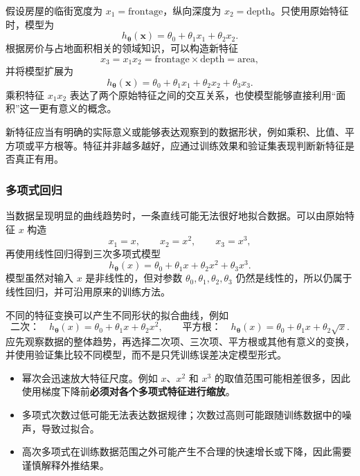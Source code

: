 \documentclass[12pt,a4paper]{ctexart}
\newcommand{\important}[1]{\textbf{\textcolor{MainColor}{#1}}}
\begin{document}
\begin{examplebox}[房价预测中的组合特征]
假设房屋的临街宽度为 $x_1=\mathrm{frontage}$，纵向深度为 $x_2=\mathrm{depth}$。只使用原始特征时，模型为
\[
  h_{\boldsymbol{\theta}}(\mathbf{x})
  =\theta_0+\theta_1x_1+\theta_2x_2.
\]
根据房价与占地面积相关的领域知识，可以构造新特征
\[
  x_3=x_1x_2
  =\mathrm{frontage}\times\mathrm{depth}
  =\mathrm{area},
\]
并将模型扩展为
\[
  h_{\boldsymbol{\theta}}(\mathbf{x})
  =\theta_0+\theta_1x_1+\theta_2x_2+\theta_3x_3.
\]
乘积特征 $x_1x_2$ 表达了两个原始特征之间的交互关系，也使模型能够直接利用“面积”这一更有意义的概念。
\end{examplebox}

\begin{tipbox}[构造特征的原则]
新特征应当有明确的实际意义或能够表达观察到的数据形状，例如乘积、比值、平方项或平方根等。特征并非越多越好，应通过训练效果和验证集表现判断新特征是否真正有用。
\end{tipbox}

\subsubsection{多项式回归}

\begin{definitionbox}[多项式回归]
当数据呈现明显的曲线趋势时，一条直线可能无法很好地拟合数据。可以由原始特征 $x$ 构造
\[
  x_1=x,\qquad x_2=x^2,\qquad x_3=x^3,
\]
再使用线性回归得到三次多项式模型
\[
  h_{\boldsymbol{\theta}}(x)
  =\theta_0+\theta_1x+\theta_2x^2+\theta_3x^3.
\]
模型虽然对输入 $x$ 是非线性的，但对参数 $\theta_0,\theta_1,\theta_2,\theta_3$ 仍然是线性的，所以仍属于线性回归，并可沿用原来的训练方法。
\end{definitionbox}

\begin{keybox}[选择合适的特征变换]
不同的特征变换可以产生不同形状的拟合曲线，例如
\[
  \text{二次：}\quad
  h_{\boldsymbol{\theta}}(x)=\theta_0+\theta_1x+\theta_2x^2,
  \qquad
  \text{平方根：}\quad
  h_{\boldsymbol{\theta}}(x)=\theta_0+\theta_1x+\theta_2\sqrt{x}.
\]
应先观察数据的整体趋势，再选择二次项、三次项、平方根或其他有意义的变换，并使用验证集比较不同模型，而不是只凭训练误差决定模型形式。
\end{keybox}

\begin{mistakebox}[多项式回归的注意事项]
\begin{itemize}
  \item 幂次会迅速放大特征尺度。例如 $x$、$x^2$ 和 $x^3$ 的取值范围可能相差很多，因此使用梯度下降前\important{必须对各个多项式特征进行缩放}。
  \item 多项式次数过低可能无法表达数据规律；次数过高则可能跟随训练数据中的噪声，导致过拟合。
  \item 高次多项式在训练数据范围之外可能产生不合理的快速增长或下降，因此需要谨慎解释外推结果。
\end{itemize}
\end{mistakebox}
\end{document}
